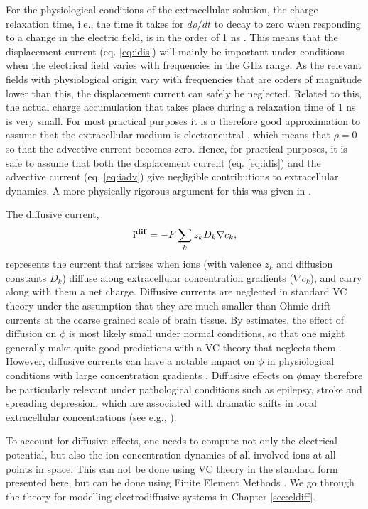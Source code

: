 For the physiological conditions of the extracellular solution, the charge relaxation time, i.e., the time it takes for $d\rho/dt$ to decay to zero when responding to a change in the electric field, is in the order of 1 ns \cite{Grodzinsky2011, Gratiy2017}. This means that the displacement current (eq. \ref{eq:idis}) will mainly be important under conditions when the electrical field varies with frequencies in the GHz range. As the relevant fields with physiological origin vary with frequencies that are orders of magnitude lower than this, the displacement current can safely be neglected. Related to this, the actual charge accumulation that takes place during a relaxation time of 1 ns is very small. For most practical purposes it is a therefore good approximation to assume that the extracellular medium is electroneutral \cite{Solbra2018}, which means that $\rho = 0$ so that the advective current becomes zero. Hence, for practical purposes, it is safe to assume that both the displacement current (eq. \ref{eq:idis}) and the advective current (eq. \ref{eq:iadv}) give negligible contributions to extracellular dynamics. A more physically rigorous argument for this was given in \cite{Gratiy2017}. 

The diffusive current,
\begin{equation}
{\bf i^{dif}} = -F \sum_k z_k D_k \nabla c_k,
\label{eq:idif}
\end{equation}
represents the current that arrises when ions (with valence $z_k$ and diffusion constants $D_k$) diffuse along extracellular concentration gradients ($\nabla c_k$), and carry along with them a net charge. Diffusive currents are neglected in standard VC theory under the assumption that they are much smaller than Ohmic drift currents at the coarse grained scale of brain tissue. By estimates, the effect of diffusion on $\phi$ is most likely small under normal conditions, 
so that one might generally make quite good predictions with a VC theory that neglects them \cite{Halnes2016, Gratiy2017}. 
However, diffusive currents can have a notable impact on $\phi$ in physiological conditions with large concentration gradients \cite{Halnes2016, Gratiy2017}. Diffusive effects on $\phi$may therefore be particularly relevant under pathological conditions such as epilepsy, stroke and spreading depression, which are associated with dramatic shifts in local extracellular concentrations (see e.g.,  \cite{Somjen2001, Frohlich2008, Wei2014, Ayata2015}). 

To account for diffusive effects, one needs to compute not only the electrical potential, but also the ion concentration dynamics of all involved ions at all points in space. This can not be done using VC theory in the standard form presented here, but can be done using Finite Element Methods \cite{Solbra2018}. We go through the theory for modelling electrodiffusive systems in Chapter \ref{sec:eldiff}.


